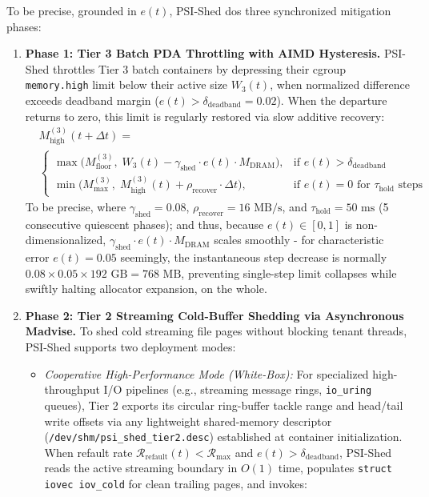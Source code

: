 \documentclass[pdflatex,sn-mathphys,Numbered]{sn-jnl}
\begin{document}
To be precise, grounded in $e(t)$, PSI-Shed dos three synchronized mitigation phases:
\begin{enumerate}
    \item \textbf{Phase 1: Tier 3 Batch PDA Throttling with AIMD Hysteresis.} PSI-Shed throttles Tier 3 batch containers by depressing their cgroup \texttt{memory.high} limit below their active size $W_3(t)$, when normalized difference exceeds deadband margin ($e(t) > \delta_{\text{deadband}} = 0.02$). When the departure returns to zero, this limit is regularly restored via slow additive recovery:
    \begin{equation}
    \begin{aligned}
    &M_{\text{high}}^{(3)}(t + \Delta t) = \\
    &\begin{cases} 
    \max\Big(M_{\text{floor}}^{(3)}, \; W_3(t) - \gamma_{\text{shed}} \cdot e(t) \cdot M_{\text{DRAM}}\Big), & \text{if } e(t) > \delta_{\text{deadband}} \\[4pt]
    \min\Big(M_{\text{max}}^{(3)}, \; M_{\text{high}}^{(3)}(t) + \rho_{\text{recover}} \cdot \Delta t\Big), & \text{if } e(t) = 0 \text{ for } \tau_{\text{hold}} \text{ steps}
    \end{cases}
    \end{aligned}
    \label{eq:pda_high}
    \end{equation}
    To be precise, where $\gamma_{\text{shed}} = 0.08$, $\rho_{\text{recover}} = 16\text{ MB/s}$, and $\tau_{\text{hold}} = 50\text{ ms}$ (5 consecutive quiescent phases); and thus, because $e(t) \in [0, 1]$ is non-dimensionalized, $\gamma_{\text{shed}} \cdot e(t) \cdot M_{\text{DRAM}}$ scales smoothly - for characteristic error $e(t) = 0.05$ seemingly, the instantaneous step decrease is normally $0.08 \times 0.05 \times 192\text{ GB} = 768\text{ MB}$, preventing single-step limit collapses while swiftly halting allocator expansion, on the whole.
    \item \textbf{Phase 2: Tier 2 Streaming Cold-Buffer Shedding via Asynchronous Madvise.} To shed cold streaming file pages without blocking tenant threads, PSI-Shed supports two deployment modes:
    \begin{itemize}
        \item \textit{Cooperative High-Performance Mode (White-Box):} For specialized high-throughput I/O pipelines (e.g., streaming message rings, \texttt{io\_uring} queues), Tier 2 exports its circular ring-buffer tackle range and head/tail write offsets via any lightweight shared-memory descriptor (\texttt{/dev/shm/psi\_shed\_tier2.desc}) established at container initialization. When refault rate $\mathcal{R}_{\text{refault}}(t) < \mathcal{R}_{\text{max}}$ and $e(t) > \delta_{\text{deadband}}$, PSI-Shed reads the active streaming boundary in $O(1)$ time, populates \texttt{struct iovec iov\_cold} for clean trailing pages, and invokes:

\end{itemize}
\end{enumerate}
\end{document}
